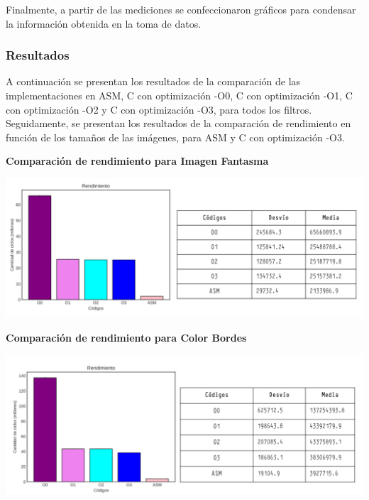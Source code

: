 \documentclass[a4paper]{article}
\begin{document}
\justify 
Finalmente, a partir de las mediciones se confeccionaron gráficos para condensar la información obtenida en la toma de datos.\\

\justify 
\subsubsection{Resultados}

\justify 
A continuación se presentan los resultados de la comparación de las implementaciones en ASM, C con optimización -O0, C con optimización -O1, C con optimización -O2 y C con optimización -O3, para todos los filtros.
\justify 
Seguidamente, se presentan los resultados de la comparación de rendimiento en función de los tamaños de las imágenes, para ASM y C con optimización -O3.\\ 

\justify 
\begin{center}
\textbf{Comparación de rendimiento para Imagen Fantasma}	
\end{center}

\begin{flushleft}
	\includegraphics[scale=0.55]{img/ImagenFantasmaConTabla.pdf}
\end{flushleft}	


\justify 
\begin{center}
	\textbf{Comparación de rendimiento para Color Bordes}
\end{center}

\begin{flushleft}
	\includegraphics[scale=0.55]{img/ColorBordesConTabla.pdf}
\end{flushleft}	
\end{document}
